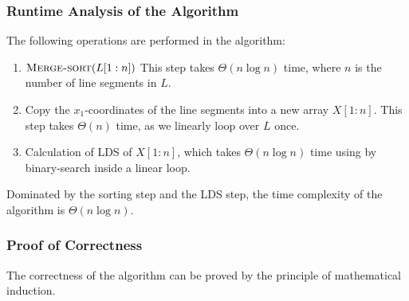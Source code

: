 \documentclass[12pt]{report}
\begin{document}
    \subsubsection*{Runtime Analysis of the Algorithm}
    The following operations are performed in the algorithm:
    \begin{enumerate}
        \item $\Call{Merge-sort}{L[1:n]}$
        This step takes $\Theta(n \log{n})$ time, where $n$ is the number of line segments in $L$.
        \item Copy the $x_{1}$-coordinates of the line segments into a new array $X[1:n]$.
        This step takes $\Theta(n)$ time, as we linearly loop over $L$ once.
        \item Calculation of LDS of $X[1:n]$, which takes $\Theta(n \log{n})$ time using by binary-search inside a linear loop.
    \end{enumerate}
    Dominated by the sorting step and the LDS step, the time complexity of the algorithm is $\Theta(n \log{n})$.

    \subsubsection*{Proof of Correctness}
    The correctness of the algorithm can be proved by the principle of mathematical induction.
\end{document}
